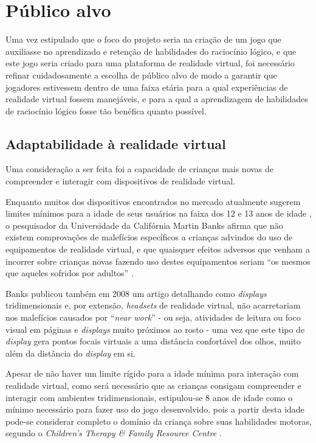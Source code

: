 \section{Público alvo}\label{sec-publico-alvo}

Uma vez estipulado que o foco do projeto seria na criação de um jogo que
auxiliasse no aprendizado e retenção de habilidades do raciocínio lógico,
e que este jogo seria criado para uma plataforma de realidade virtual,
foi necessário refinar cuidadosamente a escolha de público alvo de modo a
garantir que jogadores estivessem dentro de uma faixa etária para a qual 
experiências de realidade virtual fossem manejáveis, e para a qual a
aprendizagem de habilidades de raciocínio lógico fosse tão benéfica quanto
possível.

\subsection{Adaptabilidade à realidade virtual}

Uma consideração a ser feita foi a capacidade de crianças mais novas de
compreender e interagir com dispositivos de realidade virtual.

Enquanto muitos dos dispositivos encontrados no mercado atualmente sugerem
limites mínimos para a idade de seus usuários na faixa dos 12 e 13 anos de
idade \cite{seeto:2016:playstation-vr}, o pesquisador da Universidade da Califórnia Martin Banks afirma que
não existem comprovações de malefícios específicos a crianças advindos do
uso de equipamentos de realidade virtual, e que quaisquer efeitos adversos
que venham a incorrer sobre crianças novas fazendo uso destes equipamentos
seriam ``os mesmos que aqueles sofridos por adultos'' \cite{hill:2016:vr-safe}.

Banks publicou também em 2008 um artigo \cite{hoffman2008vergence} 
detalhando como \textit{displays}
tridimensionais e, por extensão, \textit{headsets} de realidade virtual,
não acarretariam nos malefícios causados por ``\textit{near work}'' - ou
seja, atividades de leitura ou foco visual em páginas e \textit{displays}
muito próximos ao rosto - uma vez que este tipo de \textit{display} gera
pontos focais virtuais a uma distância confortável dos olhos, muito além
da distância do \textit{display} em si.

Apesar de não haver um limite rígido para a idade mínima para interação com
realidade virtual, como será necessário que as crianças consigam compreender
e interagir com ambientes tridimensionais, estipulou-se 8 anos de idade como
o mínimo necessário para fazer uso do jogo desenvolvido, pois a partir desta
idade pode-se considerar completo o domínio da criança sobre suas habilidades
motoras, segundo o \textit{Children’s Therapy \& Family Resource Centre} \cite{ctfrc:motor-skills}.

